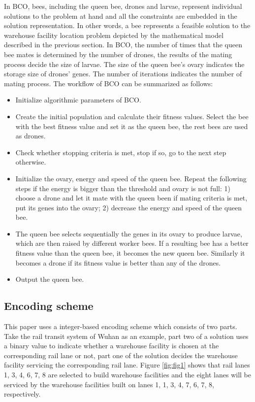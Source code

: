 In BCO, bees, including the queen bee, drones and larvae, represent individual solutions to the problem at hand and all the constraints are embedded in the solution representation.
In other words, a bee represents a feasible solution to the warehouse facility location problem depicted by the mathematical model described in the previous section.
In BCO, the number of times that the queen bee mates is determined by the number of drones, the results of the mating process decide the size of larvae.
The size of the queen bee's ovary indicates the storage size of drones' genes.
The number of iterations indicates the number of mating process.
The workflow of BCO can be summarized as follows:
\begin{itemize}
	\item Initialize algorithmic parameters of BCO.
	\item Create the initial population and calculate their fitness values. Select the bee with the best fitness value and set it as the queen bee, the rest bees are used as drones.
	\item Check whether stopping criteria is met, stop if so, go to the next step otherwise.
	\item Initialize the ovary, energy and speed of the queen bee. 
	Repeat the following steps if the energy is bigger than the threshold and ovary is not full: 1) choose a drone and let it mate with the queen been if mating criteria is met, put its genes into the ovary; 2) decrease the energy and speed of the queen bee.
	\item The queen bee selects sequentially the genes in its ovary to produce larvae, which are then raised by different worker bees. If a resulting bee has a better fitness value than the queen bee, it becomes the new queen bee. Similarly it becomes a drone if its fitness value is better than any of the drones.
	\item Output the queen bee.
\end{itemize}



\subsection{Encoding scheme}
This paper uses a integer-based encoding scheme which consists of two parts.
Take the rail transit system of Wuhan as an example, part two of a solution uses a binary value to indicate whether a warehouse facility is chosen at the corresponding rail lane or not, part one of the solution decides the warehouse facility servicing the corresponding rail lane.
Figure \ref{fig:fig1} shows that rail lanes 1, 3, 4, 6, 7, 8 are selected to build warehouse facilities and the eight lanes will be serviced by the warehouse facilities built on lanes 1, 1, 3, 4, 7, 6, 7, 8, respectively.

